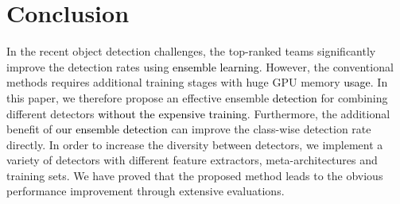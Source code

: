\documentclass[10pt,twocolumn,letterpaper]{article}
\newcommand{\RE}{\textcolor{black}}
\begin{document}
\section{Conclusion}
In the recent object detection challenges, the top-ranked teams significantly improve the detection rates using \RE{ensemble learning}. However, the conventional methods requires additional training stages with huge GPU memory \RE{usage}. In this paper, we therefore propose an effective ensemble \RE{detection} for combining different detectors \RE{without the expensive training}. Furthermore, the additional benefit of \RE{our ensemble detection} can improve the class-wise detection rate directly. In order to increase the diversity between detectors, we implement a variety of detectors with different feature extractors, meta-architectures and training sets. We have proved that the proposed method leads to the obvious performance improvement through extensive evaluations. 



{\small


}
\end{document}
